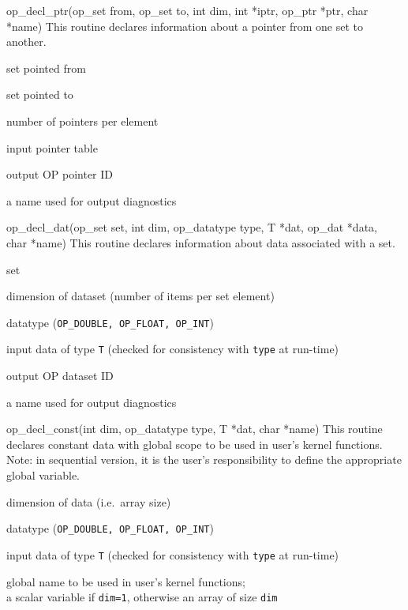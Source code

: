 \begin{routine} {op\_decl\_ptr(op\_set from, op\_set to, int dim, int *iptr, op\_ptr *ptr, char *name)}
{This routine declares information about a pointer from one set to another.}

\item[from]          set pointed from
\item[to]            set pointed to
\item[dim]           number of pointers per element
\item[iptr]          input pointer table
\item[ptr]           output OP pointer ID
\item[name]          a name used for output diagnostics
\end{routine}

\newpage

\begin{routine} {op\_decl\_dat(op\_set set, int dim, op\_datatype type, T *dat, op\_dat *data,\\ char *name)}
{This routine declares information about data associated with a set.}

\item[set]           set
\item[dim]           dimension of dataset (number of items per set element)
\item[type]          datatype ({\tt OP\_DOUBLE, OP\_FLOAT, OP\_INT})
\item[idat]          input data of type {\tt T}  (checked for consistency with {\tt type} at run-time)
\item[dat]           output OP dataset ID
\item[name]          a name used for output diagnostics
\end{routine}

\begin{routine} {op\_decl\_const(int dim, op\_datatype type, T *dat, char *name)}
{This routine declares constant data with global scope to be used in user's kernel functions.
Note: in sequential version, it is the user's responsibility to define the appropriate global
variable.}

\item[dim]           dimension of data (i.e.~array size)
\item[type]          datatype ({\tt OP\_DOUBLE, OP\_FLOAT, OP\_INT})
\item[idat]          input data of type {\tt T}  (checked for consistency with {\tt type} at run-time)
\item[name]          global name to be used in user's kernel functions;\\
                     a scalar variable if {\tt dim=1}, otherwise an array of size {\tt dim}
\end{routine}


